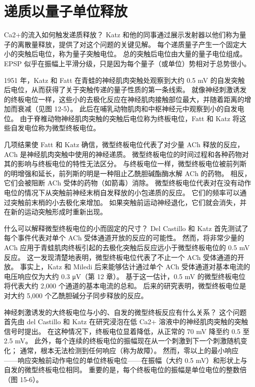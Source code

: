 \section{递质以量子单位释放}
Ca2+的流入如何触发递质释放？ Katz 和他的同事通过展示发射器以他们称为量子的离散量释放，提供了对这个问题的关键见解。 每个递质量子产生一个固定大小的突触后电位，称为量子突触电位。 总的突触后电位由大量的量子电位组成。 EPSP 似乎在振幅上平滑分级，只是因为每个量子（或单位）势相对于总势很小。

1951 年，Katz 和 Fatt 在青蛙的神经肌肉突触处观察到大约 0.5 mV 的自发突触后电位，从而获得了关于突触传递的量子性质的第一条线索。 就像神经刺激诱发的终板电位一样，这些小的去极化反应在神经肌肉接触部位最大，并随着距离的增加而衰减（见图 12-5）。 此后在哺乳动物肌肉和中枢神经元中观察到小的自发电位。 由于脊椎动物神经肌肉突触的突触后电位称为终板电位，Fatt 和 Katz 将这些自发电位称为微型终板电位。

几项结果使 Fatt 和 Katz 确信，微型终板电位代表了对少量 ACh 释放的反应，ACh 是神经肌肉突触中使用的神经递质。 微型终板电位的时间过程和各种药物对其的影响与终板电位的特性无法区分。 与终板电位一样，微型终板电位被前列斯的明增强和延长，前列斯的明是一种阻止乙酰胆碱酯酶水解 ACh 的药物。 相反，它们会被阻断 ACh 受体的药物（如箭毒）消除。 微型终板电位代表对在没有动作电位的情况下从突触前神经末梢自发释放的小包递质的反应。 它们的频率可以通过突触前末梢的小去极化来增加。 如果突触前运动神经退化，它们就会消失，并在新的运动突触形成时重新出现。

什么可以解释微型终板电位的小而固定的尺寸？ Del Castillo 和 Katz 首先测试了每个事件代表对单个 ACh 受体通道开放的反应的可能性。 然而，将非常少量的 ACh 应用于青蛙肌肉终板引起的去极化突触后反应远小于微型终板电位的 0.5 mV 反应。 这一发现清楚地表明，微型终板电位代表了不止一个 ACh 受体通道的开放。 事实上，Katz 和 Miledi 后来能够估计通过单个 ACh 受体通道对基本电流的电压响应仅为大约 0.3 μV（第 12 章）。 基于这一估计，0.5 mV 的微型终板电位将代表大约 2,000 个通道的基本电流的总和。 后来的研究表明，微型终板电位是对大约 5,000 个乙酰胆碱分子同步释放的反应。

神经刺激诱发的大终板电位与小的、自发的微型终板反应有什么关系？ 这个问题首先由 del Castillo 和 Katz 在研究浸泡在低 Ca2+ 溶液中的神经肌肉突触的突触信号时提出。 在这种情况下，终板电位显着降低，从正常的 70 mV 降至约 0.5 至 2.5 mV。 此外，每个连续的终板电位的振幅现在从一个刺激到下一个刺激随机变化； 通常，根本无法检测到任何响应（称为故障）。 然而，零以上的最小响应——响应突触前动作电位的单位终板电位——在振幅（大约 0.5 mV）和形状上与自发的微型终板电位相同。 重要的是，每个终板电位的振幅是单位电位的整数倍（图 15-6）。

